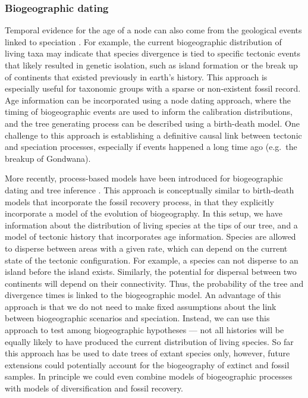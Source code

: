 \documentclass[11pt]{article}
\begin{document}

\subsubsection{Biogeographic dating}

Temporal evidence for the age of a node can also come from the geological events linked to speciation \cite{Ho2015,deBaets2016}.
For example, the current biogeographic distribution of living taxa may indicate that species divergence is tied to specific tectonic events that likely resulted in genetic isolation, such as island formation or the break up of continents that existed previously in earth's history.
This approach is especially useful for taxonomic groups with a sparse or non-existent fossil record.
Age information can be incorporated using a node dating approach, where the timing of biogeographic events are used to inform the calibration distributions, and the tree generating process can be described using a birth-death model.
One challenge to this approach is establishing a definitive causal link between tectonic and speciation processes, especially if events happened a long time ago (e.g.\ the breakup of Gondwana).


More recently, process-based models have been introduced for biogeographic dating and tree inference \cite{Landis2016,Landis2019}.
This approach is conceptually similar to birth-death models that incorporate the fossil recovery process, in that they explicitly incorporate a model of the evolution of biogeography.
In this setup, we have information about the distribution of living species at the tips of our tree, and a model of tectonic history that incorporates age information. 
Species are allowed to disperse between areas with a given rate, which can depend on the current state of the tectonic configuration.
For example, a species can not disperse to an island before the island exists. 
Similarly, the potential for dispersal between two continents will depend on their connectivity.
Thus, the probability of the tree and divergence times is linked to the biogeographic model.
An advantage of this approach is that we do not need to make fixed assumptions about the link between biogeographic scenarios and speciation.
Instead, we can use this approach to test among biogeographic hypotheses --- not all histories will be equally likely to have produced the current distribution of living species.
So far this approach has be used to date trees of extant species only, however, future extensions could potentially account for the biogeography of extinct and fossil samples.
In principle we could even combine models of biogeographic processes with models of diversification and fossil recovery. 
\end{document}
